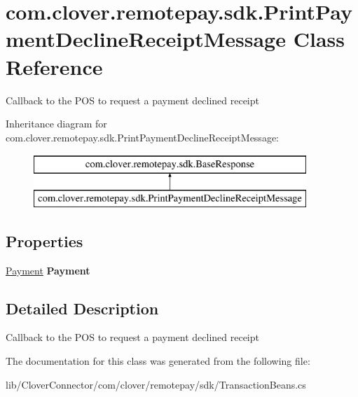 \hypertarget{classcom_1_1clover_1_1remotepay_1_1sdk_1_1_print_payment_decline_receipt_message}{}\section{com.\+clover.\+remotepay.\+sdk.\+Print\+Payment\+Decline\+Receipt\+Message Class Reference}
\label{classcom_1_1clover_1_1remotepay_1_1sdk_1_1_print_payment_decline_receipt_message}


Callback to the P\+OS to request a payment declined receipt  


Inheritance diagram for com.\+clover.\+remotepay.\+sdk.\+Print\+Payment\+Decline\+Receipt\+Message\+:\begin{figure}[H]
\begin{center}
\leavevmode
\includegraphics[height=2.000000cm]{classcom_1_1clover_1_1remotepay_1_1sdk_1_1_print_payment_decline_receipt_message}
\end{center}
\end{figure}
\subsection*{Properties}
\begin{DoxyCompactItemize}
\item 
\mbox{\label{classcom_1_1clover_1_1remotepay_1_1sdk_1_1_print_payment_decline_receipt_message_a8c10fc5bbfe151c7dc1e8f112614fac3}} 
\hyperlink{classcom_1_1clover_1_1sdk_1_1v3_1_1payments_1_1_payment}{Payment} {\bfseries Payment}
\end{DoxyCompactItemize}


\subsection{Detailed Description}
Callback to the P\+OS to request a payment declined receipt 



The documentation for this class was generated from the following file\+:\begin{DoxyCompactItemize}
\item 
lib/\+Clover\+Connector/com/clover/remotepay/sdk/Transaction\+Beans.\+cs\end{DoxyCompactItemize}
